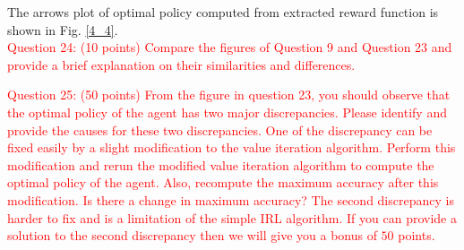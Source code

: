 \documentclass[11pt]{article}
\begin{document}
The arrows plot of optimal policy computed from extracted reward function is shown in Fig. \ref{4_4}.\\

\textcolor{red}{
    Question 24: (10 points) Compare the figures of Question 9 and Question 23 and provide a brief explanation on their similarities and differences.
}

\textcolor{red}{
    Question 25: (50 points) From the figure in question 23, you should observe that the optimal policy of the agent has two major discrepancies. Please identify and provide the causes for these two discrepancies. One of the discrepancy can be fixed easily by a slight modification to the value iteration algorithm. Perform this modification and rerun the modified value iteration algorithm to compute the optimal policy of the agent. Also, recompute the maximum accuracy after this modification. Is there a change in maximum accuracy? The second discrepancy is harder to fix and is a limitation of the simple IRL algorithm. If you can provide a solution to the second discrepancy then we will give you a bonus of $50$ points.
}
\end{document}
